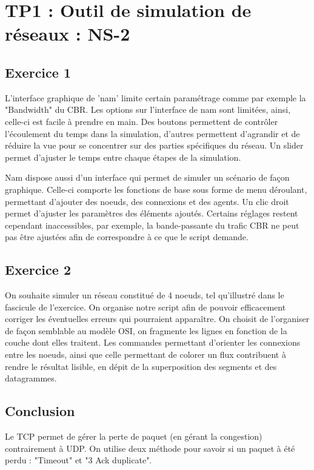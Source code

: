 \documentclass{article}
\begin{document}
\section{TP1 : Outil de simulation de réseaux : NS-2}
    \subsection{Exercice 1}
        L'interface graphique de 'nam' limite certain paramétrage comme par exemple la "Bandwidth" du CBR.
        Les options sur l'interface de nam sont limitées, ainsi, celle-ci est facile à prendre en main. Des boutons permettent de contrôler l'écoulement du temps dans la simulation, d'autres permettent d'agrandir et de réduire la vue pour se concentrer sur des parties spécifiques du réseau. Un slider permet d'ajuster le temps entre chaque étapes de la simulation.

        Nam dispose aussi d'un interface qui permet de simuler un scénario de façon graphique. Celle-ci comporte les fonctions de base sous forme de menu déroulant, permettant d'ajouter des noeuds, des connexions et des agents. Un clic droit permet d'ajuster les paramètres des éléments ajoutés.
        Certains réglages restent cependant inaccessibles, par exemple, la bande-passante du trafic CBR ne peut pas être ajustées afin de correspondre à ce que le script demande.
    \subsection{Exercice 2}
        On souhaite simuler un réseau constitué de 4 noeuds, tel qu'illustré dans le fascicule de l'exercice. On organise notre script afin de pouvoir efficacement corriger les éventuelles erreurs qui pourraient apparaître. On choisit de l'organiser de façon semblable au modèle OSI, on fragmente les lignes en fonction de la couche dont elles traitent.
        Les commandes permettant d'orienter les connexions entre les noeuds, ainsi que celle permettant de colorer un flux contribuent à rendre le résultat lisible, en dépit de la superposition des segments et des datagrammes.

    \subsection{Conclusion}
        Le TCP permet de gérer la perte de paquet (en gérant la congestion) contrairement à UDP.
        On utilise deux méthode pour savoir si un paquet à été perdu : "Timeout" et "3 Ack duplicate".
        
\end{document}
